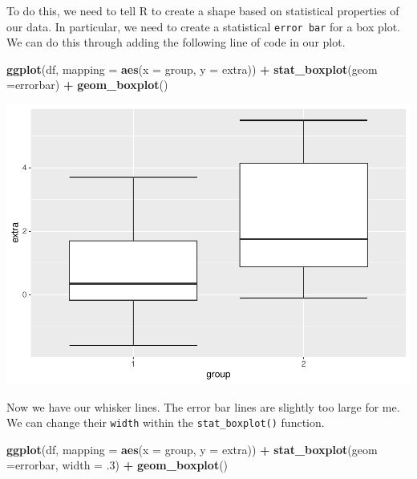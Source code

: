\documentclass[
]{book}
\newenvironment{Shaded}{\begin{snugshade}}{\end{snugshade}}
\newcommand{\AttributeTok}[1]{\textcolor[rgb]{0.13,0.29,0.53}{#1}}
\newcommand{\DecValTok}[1]{\textcolor[rgb]{0.00,0.00,0.81}{#1}}
\newcommand{\FunctionTok}[1]{\textcolor[rgb]{0.13,0.29,0.53}{\textbf{#1}}}
\newcommand{\NormalTok}[1]{#1}
\newcommand{\SpecialCharTok}[1]{\textcolor[rgb]{0.81,0.36,0.00}{\textbf{#1}}}
\newcommand{\StringTok}[1]{\textcolor[rgb]{0.31,0.60,0.02}{#1}}
\begin{document}
To do this, we need to tell R to create a shape based on statistical properties of our data. In particular, we need to create a statistical \texttt{error\ bar} for a box plot. We can do this through adding the following line of code in our plot.

\begin{Shaded}
\begin{Highlighting}[]
\FunctionTok{ggplot}\NormalTok{(df, }\AttributeTok{mapping =} \FunctionTok{aes}\NormalTok{(}\AttributeTok{x =}\NormalTok{ group, }\AttributeTok{y =}\NormalTok{ extra)) }\SpecialCharTok{+}
  \FunctionTok{stat\_boxplot}\NormalTok{(}\AttributeTok{geom =}\StringTok{\textquotesingle{}errorbar\textquotesingle{}}\NormalTok{) }\SpecialCharTok{+}
  \FunctionTok{geom\_boxplot}\NormalTok{()}
\end{Highlighting}
\end{Shaded}

\includegraphics{rintro_demo_files/figure-latex/unnamed-chunk-281-1.pdf}

Now we have our whisker lines. The error bar lines are slightly too large for me. We can change their \texttt{width} within the \texttt{stat\_boxplot()} function.

\begin{Shaded}
\begin{Highlighting}[]
\FunctionTok{ggplot}\NormalTok{(df, }\AttributeTok{mapping =} \FunctionTok{aes}\NormalTok{(}\AttributeTok{x =}\NormalTok{ group, }\AttributeTok{y =}\NormalTok{ extra)) }\SpecialCharTok{+}
  \FunctionTok{stat\_boxplot}\NormalTok{(}\AttributeTok{geom =}\StringTok{\textquotesingle{}errorbar\textquotesingle{}}\NormalTok{, }\AttributeTok{width =}\NormalTok{ .}\DecValTok{3}\NormalTok{) }\SpecialCharTok{+}
  \FunctionTok{geom\_boxplot}\NormalTok{()}
\end{Highlighting}
\end{Shaded}
\end{document}
